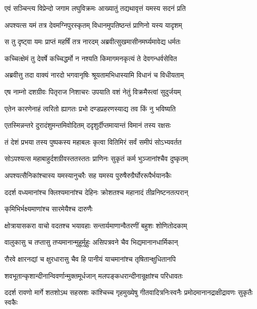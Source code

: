 
\twolineshloka
{एवं सञ्चिन्त्य विप्रेन्दो जगाम लघुविक्रमः}
{आख्यातुं तद्यथावृत्तं यमस्य सदनं प्रति} %

\twolineshloka
{अपश्यत्स यमं तत्र देवमग्निपुरस्कृतम्}
{विधानमुपतिष्ठन्तं प्राणिनो यस्य यादृशम्} %

\twolineshloka
{स तु दृष्ट्वा यमः प्राप्तं महर्षिं तत्र नारदम्}
{अब्रवीत्सुखमासीनमर्घ्यमावेद्य धर्मतः} %

\twolineshloka
{कच्चित्क्षेमं तु देवर्षे कच्चिद्धर्मो न नश्यति}
{किमागमनकृत्यं ते देवगन्धर्वसेवित} %

\twolineshloka
{अब्रवीत्तु तदा वाक्यं नारदो भगवानृषिः}
{श्रूयतामभिधास्यामि विधानं च विधीयताम्} %

\twolineshloka
{एष नाम्नो दशग्रीवः पितृराज निशाचरः}
{उपयाति वशं नेतुं विक्रमैस्त्वां सुदुर्जयम्} %

\twolineshloka
{एतेन कारणेनाहं त्वरितो ह्यागतः प्रभो}
{दण्डप्रहरणस्याद्य तव किं नु भविष्यति} %

\twolineshloka
{एतस्मिन्नन्तरे दुरादंशुमन्तमिवोदितम्}
{ददृशुर्दीप्तमायान्तं विमानं तस्य रक्षसः} %

\twolineshloka
{तं देशं प्रभया तस्य पुष्पकस्य महाबलः}
{कृत्वा वितिमिरं सर्वं समीपं सोऽभ्यवर्तत} %

\twolineshloka
{सोऽपश्यत्स महाबाहुर्दशग्रीवस्ततस्ततः}
{प्राणिनः सुकृतं कर्म भुञ्जानांश्चैव दुष्कृतम्} %

\twolineshloka
{अपश्यत्सैनिकांश्चास्य यमस्यानुचरैः सह}
{यमस्य पुरुषैरुग्रैर्घोररूपैर्भयानकैः} %

\twolineshloka
{ददर्श वध्यमानांश्च क्लिश्यमानांश्च देहिनः}
{क्रोशतश्च महानादं तीव्रनिष्टनतत्परान्} %

\onelineshloka
{कृमिभिर्भक्ष्यमाणांश्च सारमेयैश्च दारुणैः} %

\twolineshloka
{क्षोत्रायासकरा वाचो वदतश्च भयावहाः}
{सन्तार्यमाणान्वैतरणीं बहुशः शोणितोदकाम्} %

\twolineshloka
{वालुकासु च तप्तासु तप्यमानान्मुहूर्मुहुः}
{असिपत्रवने चैव भिद्यमानानधार्मिकान्} %

\twolineshloka
{रौरवे क्षारनद्यां च क्षुरधारासु चैव हि}
{पानीयं याचमानांश्च तृषितान्क्षुधितानपि} %

\twolineshloka
{शवभूतान्कृशान्दीनान्विवर्णान्मुक्तमूर्धजान्}
{मलपङ्कधरान्दीनान्रूक्षांश्च परिधावतः} %

\threelineshloka
{ददर्श रावणो मार्गे शतशोऽथ सहस्रशः}
{कांश्चिच्च गृहमुख्येषु गीतवादित्रनिःस्वनैः}
{प्रमोदमानानद्राक्षीद्रावणः सुकृतैः स्वकैः} %

